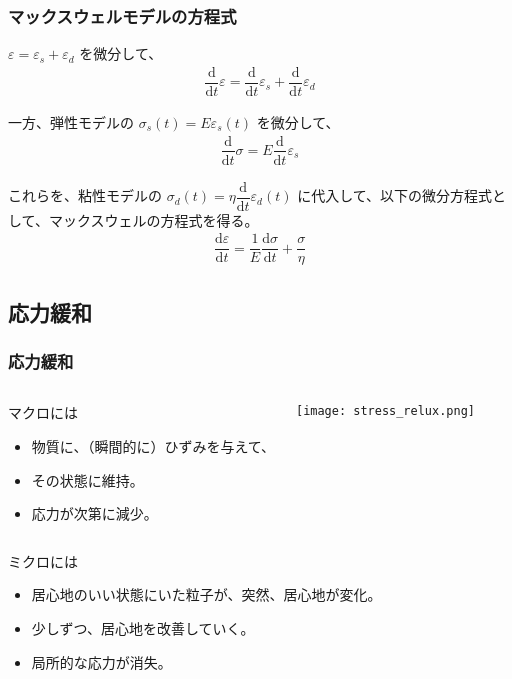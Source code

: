 \documentclass[12pt, dvipdfmx]{beamer}
\begin{document}
\begin{frame}
	\frametitle{マックスウェルモデルの方程式}
		\small
		$\varepsilon = \varepsilon_s + \varepsilon_d$ を微分して、
		\begin{align*}
			\dfrac{\mathrm{d}}{\mathrm{d}t}\varepsilon = \dfrac{\mathrm{d}}{\mathrm{d}t}\varepsilon_s + \dfrac{\mathrm{d}}{\mathrm{d}t}\varepsilon_d
		\end{align*}
		
		一方、弾性モデルの $\sigma_s(t) = E \varepsilon_s(t)$ を微分して、
		\begin{align*}
			\dfrac{\mathrm{d}}{\mathrm{d}t}\sigma = E \dfrac{\mathrm{d}}{\mathrm{d}t}\varepsilon_s
		\end{align*}

		これらを、粘性モデルの $\sigma_d(t) = \eta \dfrac{\mathrm{d}}{\mathrm{d}t}\varepsilon_d(t)$ に代入して、以下の微分方程式として、\alert{マックスウェルの方程式}を得る。
		\color{red}
		\begin{align*}
			\dfrac{\mathrm{d}\varepsilon}{\mathrm{d}t} = \dfrac{1}{E} \dfrac{\mathrm{d}\sigma}{\mathrm{d}t} + \dfrac{\sigma}{\eta}
		\end{align*}
\end{frame}

\subsection{応力緩和}
\begin{frame}
	\frametitle{応力緩和}
		\begin{columns}[T, onlytextwidth]
				\begin{block}{マクロには}
					\begin{itemize}
						\item 物質に、（瞬間的に）ひずみを与えて、
						\item その状態に維持。
						\item 応力が次第に減少。
					\end{itemize}
				\end{block}
			\texttt{[image: stress\_relux.png]}
		\end{columns}
		
		\begin{exampleblock}{ミクロには}
			\begin{itemize}
				\item 居心地のいい状態にいた粒子が、突然、居心地が変化。
				\item 少しずつ、\alert{居心地を改善}していく。
				\item 局所的な応力が消失。
			\end{itemize}
		\end{exampleblock}
\end{frame}
\end{document}
